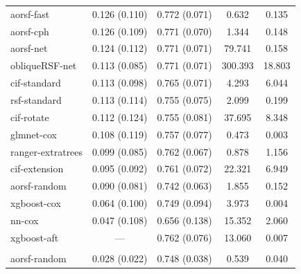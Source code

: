\documentclass{article}\usepackage[]{graphicx}\usepackage[]{xcolor}
\newenvironment{knitrout}{}{} %
\begin{document}
\begin{knitrout}
\begin{longtable}[t]{lcccc}
\endfoot
\bottomrule
\endlastfoot
\addlinespace[0.3em]
\multicolumn{5}{l}{\textit{\textbf{Overall}}}\\
\hline
\hspace{1em}aorsf-fast & 0.126 (0.110) & 0.772 (0.071) & 0.632 & 0.135\\
\hspace{1em}aorsf-cph & 0.126 (0.109) & 0.771 (0.070) & 1.344 & 0.148\\
\hspace{1em}aorsf-net & 0.124 (0.112) & 0.771 (0.071) & 79.741 & 0.158\\
\hspace{1em}obliqueRSF-net & 0.113 (0.085) & 0.771 (0.071) & 300.393 & 18.803\\
\hspace{1em}cif-standard & 0.113 (0.098) & 0.765 (0.071) & 4.293 & 6.044\\
\hspace{1em}rsf-standard & 0.113 (0.114) & 0.755 (0.075) & 2.099 & 0.199\\
\hspace{1em}cif-rotate & 0.112 (0.124) & 0.755 (0.081) & 37.695 & 8.348\\
\hspace{1em}glmnet-cox & 0.108 (0.119) & 0.757 (0.077) & 0.473 & 0.003\\
\hspace{1em}ranger-extratrees & 0.099 (0.085) & 0.762 (0.067) & 0.878 & 1.156\\
\hspace{1em}cif-extension & 0.095 (0.092) & 0.761 (0.072) & 22.321 & 6.949\\
\hspace{1em}aorsf-random & 0.090 (0.081) & 0.742 (0.063) & 1.855 & 0.152\\
\hspace{1em}xgboost-cox & 0.064 (0.100) & 0.749 (0.094) & 3.973 & 0.004\\
\hspace{1em}nn-cox & 0.047 (0.108) & 0.656 (0.138) & 15.352 & 2.060\\
\hspace{1em}xgboost-aft & --- & 0.762 (0.076) & 13.060 & 0.007\\
\addlinespace[0.3em]
\multicolumn{5}{l}{\textit{\textbf{ACTG 320; AIDS diagnosis, n = 1151, p = 12}}}\\
\hline
\hspace{1em}aorsf-random & 0.028 (0.022) & 0.748 (0.038) & 0.539 & 0.040\\

\end{longtable}
\end{knitrout}
\end{document}
